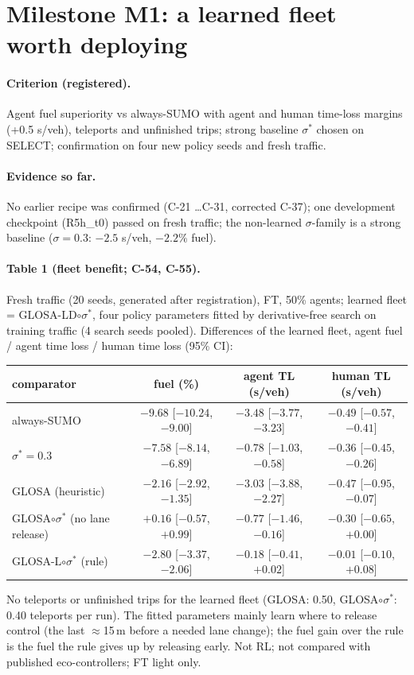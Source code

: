 \documentclass[11pt]{article}
\begin{document}
\section{Milestone M1: a learned fleet worth deploying}
\paragraph{Criterion (registered).} Agent fuel superiority vs always-SUMO with agent and human time-loss margins (+0.5 s/veh),
teleports and unfinished trips; strong baseline $\sigma^*$ chosen on SELECT; confirmation on four new policy seeds and fresh traffic.
\paragraph{Evidence so far.} No earlier recipe was confirmed (C-21 \dots C-31, corrected C-37); one development checkpoint (R5h\_t0)
passed on fresh traffic; the non-learned $\sigma$-family is a strong baseline ($\sigma=0.3$: $-2.5$ s/veh, $-2.2\%$ fuel).
\paragraph{Table 1 (fleet benefit; C-54, C-55).} Fresh traffic (20 seeds, generated after registration), FT, 50\% agents; learned
fleet = GLOSA-LD$\circ\sigma^*$, four policy parameters fitted by derivative-free search on training traffic (4 search seeds pooled).
Differences of the learned fleet, agent fuel / agent time loss / human time loss (95\% CI):
\begin{center}\small\begin{tabular}{lccc}\toprule
comparator & fuel (\%) & agent TL (s/veh) & human TL (s/veh)\\\midrule
always-SUMO & $-9.68$ [$-10.24$, $-9.00$] & $-3.48$ [$-3.77$, $-3.23$] & $-0.49$ [$-0.57$, $-0.41$]\\
$\sigma^*=0.3$ & $-7.58$ [$-8.14$, $-6.89$] & $-0.78$ [$-1.03$, $-0.58$] & $-0.36$ [$-0.45$, $-0.26$]\\
GLOSA (heuristic) & $-2.16$ [$-2.92$, $-1.35$] & $-3.03$ [$-3.88$, $-2.27$] & $-0.47$ [$-0.95$, $-0.07$]\\
GLOSA$\circ\sigma^*$ (no lane release) & $+0.16$ [$-0.57$, $+0.99$] & $-0.77$ [$-1.46$, $-0.16$] & $-0.30$ [$-0.65$, $+0.00$]\\
GLOSA-L$\circ\sigma^*$ (rule) & $-2.80$ [$-3.37$, $-2.06$] & $-0.18$ [$-0.41$, $+0.02$] & $-0.01$ [$-0.10$, $+0.08$]\\\bottomrule
\end{tabular}\end{center}
No teleports or unfinished trips for the learned fleet (GLOSA: 0.50, GLOSA$\circ\sigma^*$: 0.40 teleports per run). The fitted
parameters mainly learn where to release control (the last $\approx$15\,m before a needed lane change); the fuel gain over the rule is the
fuel the rule gives up by releasing early. Not RL; not compared with published eco-controllers; FT light only.
\end{document}
